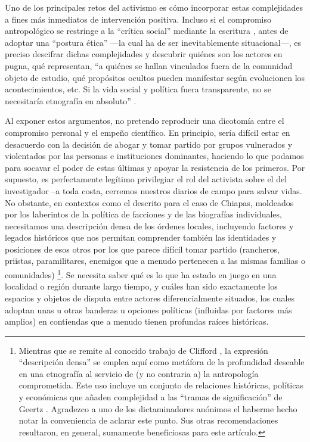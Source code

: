 \documentclass[
  spanish,
  11pt,
  a4paper,
]{scrbook}
\begin{document}
Uno de los principales retos del activismo es cómo incorporar estas
complejidades a fines más inmediatos de intervención positiva. Incluso
si el compromiso antropológico se restringe a la ``crítica social''
mediante la escritura \autocite[208-209]{Low2010}, antes de adoptar una
``postura ética'' ---la cual ha de ser inevitablemente situacional---,
es preciso descifrar dichas complejidades y descubrir quiénes son los
actores en pugna, qué representan, ``a quiénes se hallan vinculados
fuera de la comunidad objeto de estudio, qué propósitos ocultos pueden
manifestar según evolucionen los acontecimientos, etc. Si la vida social
y política fuera transparente, no se necesitaría etnografía en
absoluto'' \autocite[372]{Gledhill2000}.

Al exponer estos argumentos, no pretendo reproducir una dicotomía entre
el compromiso personal y el empeño científico. En principio, sería
difícil estar en desacuerdo con la decisión de abogar y tomar partido
por grupos vulnerados y violentados por las personas e instituciones
dominantes, haciendo lo que podamos para socavar el poder de estas
últimas y apoyar la resistencia de los primeros. Por supuesto, es
perfectamente legítimo privilegiar el rol del activista sobre el del
investigador --a toda costa, cerremos nuestros diarios de campo para
salvar vidas. No obstante, en contextos como el descrito para el caso de
Chiapas, moldeados por los laberintos de la política de facciones y de
las biografías individuales, necesitamos una descripción densa de los
órdenes locales, incluyendo factores y legados históricos que nos
permitan comprender también las identidades y posiciones de esos otros
por los que parece difícil tomar partido (rancheros, priistas,
paramilitares, enemigos que a menudo pertenecen a las mismas familias o
comunidades) \footnote{Mientras que se remite al conocido trabajo de
  Clifford \textcite{Geertz1973}, la expresión ``descripción densa'' se
  emplea aquí como metáfora de la profundidad deseable en una etnografía
  al servicio de (y no contraria a) la antropología comprometida. Este
  uso incluye un conjunto de relaciones históricas, políticas y
  económicas que añaden complejidad a las ``tramas de significación'' de
  Geertz \autocite[18-29]{Roseberry1989}. Agradezco a uno de los
  dictaminadores anónimos el haberme hecho notar la conveniencia de
  aclarar este punto. Sus otras recomendaciones resultaron, en general,
  sumamente beneficiosas para este artículo.}. Se necesita saber qué es
lo que ha estado en juego en una localidad o región durante largo
tiempo, y cuáles han sido exactamente los espacios y objetos de disputa
entre actores diferencialmente situados, los cuales adoptan unas u otras
banderas u opciones políticas (influidas por factores más amplios) en
contiendas que a menudo tienen profundas raíces históricas.
\end{document}
